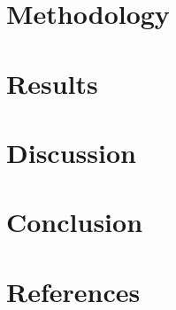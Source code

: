 \documentclass[a4paper]{jpconf} %
\begin{document}
\section{Methodology}
\label{ch:method}


\section{Results}
\label{ch:results}



\section{Discussion}
\label{ch:discussion}


\section{Conclusion}
\label{ch:conclusion}


% 

%  


\section*{References}
   
  
\end{document}
